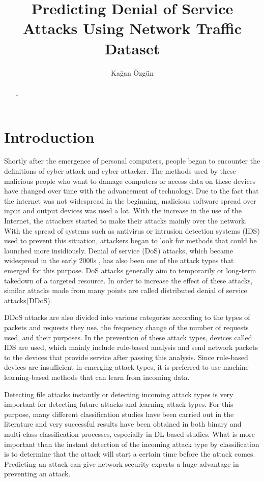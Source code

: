 \documentclass{article}
\author{Kağan Özgün}
\title{Predicting Denial of Service Attacks Using Network Traffic Dataset}
\begin{document}
\maketitle

\begin{abstract}
-
\end{abstract}

\section{Introduction}
Shortly after the emergence of personal computers, people began to encounter the definitions of cyber attack and cyber attacker. The methods used by these malicious people who want to damage computers or access data on these devices have changed over time with the advancement of technology. Due to the fact that the internet was not widespread in the beginning, malicious software spread over input and output devices was used a lot. With the increase in the use of the
Internet, the attackers started to make their attacks mainly over the network. With the spread of systems such as antivirus or intrusion detection systems (IDS) used to prevent this situation,
attackers began to look for methods that could be launched more insidiously. Denial of service (DoS) attacks, which became widespread in the early 2000s \cite{Rangapur}, has also been
one of the attack types that emerged for this purpose. DoS attacks generally aim to temporarily or long-term takedown of a targeted resource. In order to increase the effect of these attacks, similar attacks made from many points are called distributed denial of service attacks(DDoS). 

DDoS attacks are also divided into various categories according to the types of packets and requests they use, the frequency change of the number of requests used, and their purposes. In the prevention of these attack types, devices called IDS are used, which mainly include rule-based analysis and send network packets to the devices that provide service after passing this analysis. Since rule-based devices are insufficient in emerging attack types, it is preferred to use machine learning-based methods that can learn from incoming data.

Detecting file attacks instantly or detecting incoming attack types is very important for detecting future attacks and learning attack types. For this purpose, many different classification studies have been carried out in the literature and very successful results have been obtained in both binary and multi-class classification processes, especially in DL-based studies. What is more important than the instant detection of the incoming attack type by classification is to determine that the attack will start a certain time before the attack comes. Predicting an attack can give network security experts a huge advantage in preventing an attack.
\end{document}
